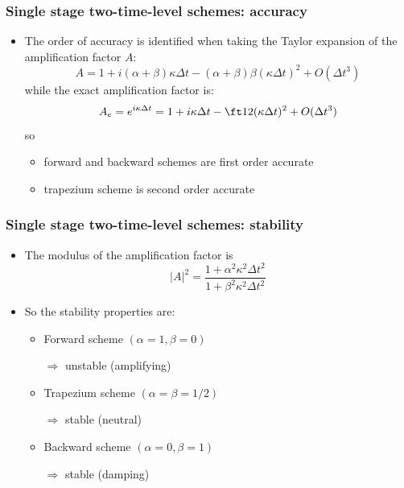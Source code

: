 \documentclass[aspectratio=149,9pt]{beamer}
\begin{document}
\begin{frame}
	\frametitle{Single stage two-time-level schemes: accuracy}
	\begin{itemize}
		\item The order of accuracy is identified when taking the Taylor expansion of the amplification factor $A$:
			\begin{equation*}
				A = 1+i(\alpha+\beta)\kappa\Delta t-(\alpha+\beta)\beta(\kappa\Delta t)^2+O(\Delta t^3)
			\end{equation*}
			while the exact amplification factor is:
			\begin{equation*}
				A_e=e^{i\kappa\Delta t}=1+i\kappa\Delta t-\ft12(\kappa\Delta t)^2+O(\Delta t^3)
			\end{equation*}
			so\vspace*{1ex}
			\begin{itemize}
				\item forward and backward schemes are first order accurate\vspace*{1ex}
				\item trapezium scheme is second order accurate
			\end{itemize}
	\end{itemize}
\end{frame}
%
%
%
\begin{frame}
	\frametitle{Single stage two-time-level schemes: stability}
	\begin{itemize}
		\item The modulus of the amplification factor is
			\begin{equation*}
				|A|^2 = \frac{1 + \alpha^2 \kappa^2 \Delta t^2}{1 + \beta^2 \kappa^2 \Delta t^2}
			\end{equation*}
		\item So the stability properties are:\vspace*{1ex}
			\begin{itemize}
				\item \parbox{5cm}{Forward scheme $(\alpha=1, \beta=0)$} $\Rightarrow$ unstable (amplifying)\vspace*{1ex}
				\item \parbox{5cm}{Trapezium scheme $(\alpha=\beta=1/2)$} $\Rightarrow$ stable (neutral)\vspace*{1ex}
				\item \parbox{5cm}{Backward scheme $(\alpha=0, \beta=1)$} $\Rightarrow$ stable (damping)
			\end{itemize}
	\end{itemize}
\end{frame}
\end{document}
